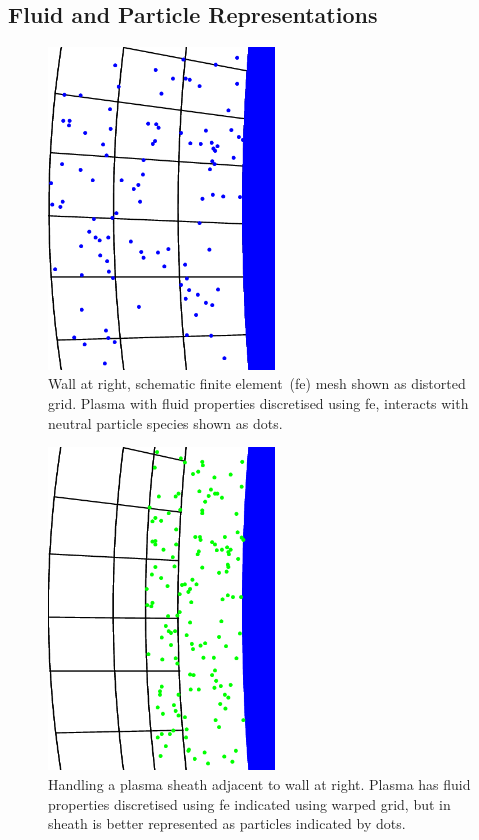 \subsection{Fluid and Particle Representations} \label{sec:fluidpart}
\begin{figure}
\centerline{\includegraphics[width=6cm]{../pics/blpclonm}}
\caption{Wall at right, schematic finite element~(fe) mesh shown as distorted grid.
Plasma with fluid properties discretised using fe, interacts with neutral particle species
shown as dots.\label{fig:pcleover}}
\end{figure}
\begin{figure}
\centerline{\includegraphics[width=6cm]{../pics/grpclovm}}
\caption{Handling a plasma sheath adjacent to wall at right.
Plasma has fluid properties discretised using fe indicated using warped grid,
but in sheath is better represented as particles indicated by dots.\label{fig:pcleadj}}
\end{figure}

